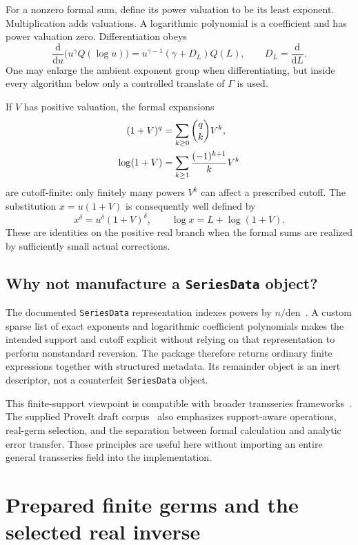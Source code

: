 \documentclass[11pt,a4paper]{article}
\numberwithin{equation}{section}
\theoremstyle{definition}
\theoremstyle{remark}
\newcommand{\dd}{\mathrm d}
\newcommand{\code}[1]{\texttt{#1}}
\begin{document}
For a nonzero formal sum, define its power valuation to be its least
exponent. Multiplication adds valuations. A logarithmic polynomial is a
coefficient and has power valuation zero. Differentiation obeys
\begin{equation}\label{eq:Euler}
 \frac{\dd}{\dd u}\bigl(u^\gamma Q(\log u)\bigr)
 =u^{\gamma-1}(\gamma+D_L)Q(L),\qquad D_L=\frac{\dd}{\dd L}.
\end{equation}
One may enlarge the ambient exponent group when differentiating, but
inside every algorithm below only a controlled translate of $\Gamma$
is used.

If $V$ has positive valuation, the formal expansions
\begin{align}\label{eq:unit-calculus}
 (1+V)^q&=\sum_{k\ge0}\binom qk V^k,\notag\\
 \log(1+V)&=\sum_{k\ge1}\frac{(-1)^{k+1}}k V^k
\end{align}
are cutoff-finite: only finitely many powers $V^k$ can affect a prescribed
cutoff. The substitution $x=u(1+V)$ is consequently well defined by
\[
 x^\delta=u^\delta(1+V)^\delta,\qquad
 \log x=L+\log(1+V).
\]
These are identities on the positive real branch when the formal sums
are realized by sufficiently small actual corrections.

\subsection{Why not manufacture a \texttt{SeriesData} object?}

The documented \code{SeriesData} representation indexes powers by
$n/\mathrm{den}$~\cite{wlseries}. A custom sparse list of exact exponents
and logarithmic coefficient polynomials makes the intended support and
cutoff explicit without relying on that representation to perform
nonstandard reversion. The package therefore returns ordinary finite
expressions together with structured metadata. Its remainder object is
an inert descriptor, not a counterfeit \code{SeriesData} object.

This finite-support viewpoint is compatible with broader transseries
frameworks~\cite{vdh}. The supplied ProveIt draft corpus~\cite{proveit}
also emphasizes support-aware operations, real-germ selection, and the
separation between formal calculation and analytic error transfer. Those
principles are useful here without importing an entire general transseries
field into the implementation.

\section{Prepared finite germs and the selected real inverse}
\label{sec:prepared}
\end{document}
